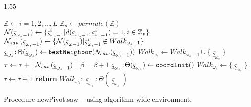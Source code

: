 

\vspace*{1ex} %
\begin{algorithm-wide}[h]{1.55\textwidth}%
\begin{algorithmic}[1]
\STATE $\mathbb{Z} \gets i = 1,2, \ldots ,L $ 
\STATE $\mathbb{Z}_p \gets permute(\mathbb{Z}) $ 
\STATE ${\cal N} ({\underline \varsigma}_{\omega_{s} -1}) \gets  \{{\underline \varsigma}_{\omega_{s} -1}^i | d({\underline \varsigma}_{\omega_{s} -1}, {\underline \varsigma}_{\omega_{s} -1}^i ) = 1, i \in \mathbb{Z}_p\}$ 
\STATE ${\cal N}_{saw} ({\underline \varsigma}_{\omega_{s} -1}) \gets  \{ {\cal N} ({\underline \varsigma}_{\omega -1}) |
                      {\underline \varsigma}_{\omega_{s} -1}^i \not\in  Walk_{\omega_{s} -1}\}$
        \STATE ${\underline \varsigma}_{\omega_{s}}\!:\!\Theta({\underline \varsigma}_{\omega_{s}}) \gets {\tt bestNeighbor}({\cal N}_{saw} ({\underline \varsigma}_{\omega_{s} -1}))$
        \STATE $Walk_{\omega_{s}} \gets Walk_{\omega_{s}-1} \cup \{{\underline \varsigma}_{\omega_{s}}\}$
        \STATE $\tau \gets \tau + |~{\cal N}_{saw} ({\underline \varsigma}_{\omega_{s} -1})~| $ 
        \STATE $\beta = \beta + 1$ 
        \STATE ${\underline \varsigma}_{\omega_{s}}\!:\!\Theta({\underline \varsigma}_{\omega_{s}}) \gets {\tt coordInit}()$ 
        \STATE $Walk_{\omega_{s}} \gets \{ {\underline \varsigma}_{\omega_{s}} \}$
        \STATE $\tau \gets \tau + 1 $ 
    \ENDIF
\STATE \textbf{return} $Walk_{\omega_{s}}\!:\!{\underline \varsigma}_{\omega_{s}}\!:\!\Theta({\underline \varsigma}_{\omega_{s}})$ 
\ENDPROCEDURE 
\end{algorithmic}
\caption[Algorithm file: alg-newPivot-wide.tex]{Procedure newPivot.saw -- using algorithm-wide environment.} 
\label{alg-newPivot-wide}
\end{algorithm-wide}